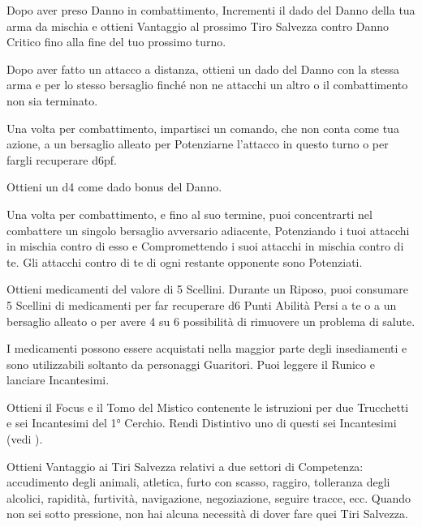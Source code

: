 \documentclass[itdr]{subfiles}
\begin{document}
\vfill
{}\feathp
Dopo aver preso Danno in combattimento, Incrementi il dado del Danno della tua arma da mischia e ottieni Vantaggio al prossimo Tiro Salvezza contro Danno Critico fino alla fine del tuo prossimo turno.

\vfill
{}
Dopo aver fatto un attacco a distanza, ottieni un dado del Danno con la stessa arma e per lo stesso bersaglio finché non ne attacchi un altro o il combattimento non sia terminato.

\vfill
{}
Una volta per combattimento, impartisci un comando, che non conta come tua azione, a un bersaglio alleato per Potenziarne l’attacco in questo turno o per fargli recuperare d6pf.

\break

\vfill
{}\featmt\feathp
Ottieni un d4 come dado bonus del Danno.

\vfill
{}\feathp
Una volta per combattimento, e fino al suo termine, puoi concentrarti nel combattere un singolo bersaglio avversario adiacente, Potenziando i tuoi attacchi in mischia contro di esso e Compromettendo i suoi attacchi in mischia contro di te. Gli attacchi contro di te di ogni restante \mbox{opponente} sono Potenziati.

\vfill
{}
Ottieni medicamenti del valore di 5 Scellini.
Durante un Riposo, puoi consumare 5 Scellini di medicamenti per far recuperare d6 Punti Abilità Persi a te o a un bersaglio alleato o per avere 4 su 6 possibilità di rimuovere un problema di salute.

I medicamenti possono essere acquistati nella maggior parte degli insediamenti e sono utilizzabili soltanto da personaggi Guaritori.
\vfill
{}
\featmt
Puoi leggere il Runico e lanciare Incantesimi.

Ottieni il Focus e il Tomo del Mistico contenente le istruzioni per due Trucchetti e sei Incantesimi del 1° Cerchio. Rendi Distintivo uno di questi sei Incantesimi (vedi \textbf{}).

\vfill
{}
\featmt
Ottieni Vantaggio ai Tiri Salvezza relativi a due settori di \mbox{Competenza}: accudimento degli animali, atletica, furto con scasso, raggiro, tolleranza degli alcolici, rapidità, furtività, navigazione, negoziazione, seguire tracce, ecc. Quando non sei sotto pressione, non hai alcuna necessità di dover fare quei Tiri Salvezza.
\end{document}

